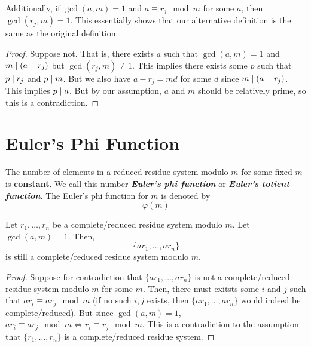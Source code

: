 Additionally, if $\gcd(a,m) = 1$ and $a \equiv r_j \mod m$ for some $a$, then $\gcd(r_j,m) = 1$. This essentially shows that our alternative definition is the same as the original definition.

\begin{proof}
    Suppose not. That is, there exists $a$ such that $\gcd(a,m) = 1$ and $m \mathrel{\mid} (a-r_j)$ but $\gcd(r_j,m) \neq 1$. This implies there exists some $p$ such that $p \mathrel{\mid} r_j$ and $p \mathrel{\mid} m$. But we also have $a - r_j = md$ for some $d$ since $m \mathrel{\mid} (a-r_j)$. This implies $p \mathrel{\mid} a$. But by our assumption, $a$ and $m$ should be relatively prime, so this is a contradiction.
\end{proof}

\section{Euler's Phi Function}

The number of elements in a reduced residue system modulo $m$ for some fixed $m$ is \textbf{constant}. We call this number \textit{\textbf{Euler's phi function}} or \textit{\textbf{Euler's totient function}}. The Euler's phi function for $m$ is denoted by
$$
\varphi(m)
$$

\begin{theorem}
    Let $r_1,\ldots,r_n$ be a complete/reduced residue system modulo $m$. Let $\gcd(a,m)=1$. Then,
    $$
    \{ ar_1,\ldots, ar_n \}
    $$
    is still a complete/reduced residue system modulo $m$.
\end{theorem}

\begin{proof}
    Suppose for contradiction that $\{ar_1,\ldots,ar_n\}$ is not a complete/reduced residue system modulo $m$ for some $m$. Then, there must exitsts some $i$ and $j$ such that $ar_i \equiv ar_j \mod m$ (if no such $i,j$ exists, then $\{ar_1,\ldots,ar_n\}$ would indeed be complete/reduced). But since $\gcd(a,m) = 1$, $ar_i \equiv ar_j \mod m \iff r_i \equiv r_j \mod m$. This is a contradiction to the assumption that $\{r_1,\ldots,r_n\}$ is a complete/reduced residue system.
\end{proof}
